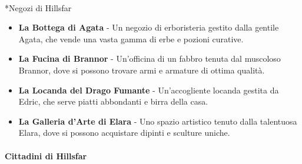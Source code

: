 \documentclass{article}
\begin{document}
\paragraph{}*{Negozi di Hillsfar}

\begin{itemize}
  \item \textbf{La Bottega di Agata} - Un negozio di erboristeria gestito dalla gentile Agata, che vende una vasta gamma di erbe e pozioni curative.
  \item \textbf{La Fucina di Brannor} - Un'officina di un fabbro tenuta dal muscoloso Brannor, dove si possono trovare armi e armature di ottima qualità.
  \item \textbf{La Locanda del Drago Fumante} - Un'accogliente locanda gestita da Edric, che serve piatti abbondanti e birra della casa.
  \item \textbf{La Galleria d'Arte di Elara} - Uno spazio artistico tenuto dalla talentuosa Elara, dove si possono acquistare dipinti e sculture uniche.
\end{itemize}

\paragraph*{Cittadini di Hillsfar}
\end{document}
